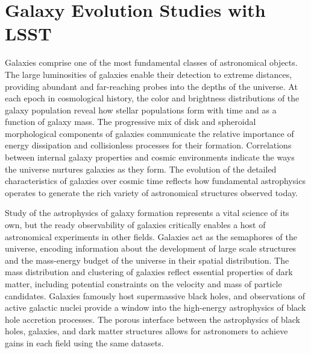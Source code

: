 
\makeatletter
\let\savedchap\@makechapterhead
\def\@makechapterhead{\vspace*{-3cm}\savedchap}
\chapter[Galaxy Evolution Studies with LSST]{Galaxy Evolution Studies with LSST}
\label{ch:science_background}
\let\@makechapterhead\savedchap
\makeatletter

{\justify


Galaxies comprise one of the most fundamental classes of astronomical objects. 
The large luminosities of galaxies enable their 
detection to extreme distances, providing abundant
and far-reaching probes into the depths of the universe.
At each epoch in cosmological history, the color
and brightness distributions of the galaxy population
reveal how stellar populations form with time and
as a function of galaxy mass. The progressive mix of
disk and spheroidal morphological components of 
galaxies communicate the relative importance of
energy dissipation and collisionless processes
for their formation.
Correlations between internal galaxy properties and
cosmic environments indicate
the ways the universe nurtures galaxies as they form.
The evolution of the
detailed characteristics of galaxies over cosmic time
reflects how fundamental astrophysics
operates to generate the rich variety of 
astronomical structures observed today.

Study of the astrophysics of galaxy formation represents
a vital science of its own, but the ready
observability of galaxies critically enables a host of
astronomical experiments in other fields. 
Galaxies act as the semaphores of the
universe, encoding information about
the development of large scale
structures and the mass-energy budget of the
universe in their spatial distribution. The mass distribution
and clustering of galaxies reflect essential
properties of dark matter, including potential
constraints on the velocity and mass of particle candidates.
Galaxies famously host supermassive black holes, 
and observations of active galactic nuclei provide
a window into the high-energy astrophysics of black hole
accretion processes. The porous interface between the
astrophysics of black holes, galaxies, and 
dark matter structures allows for astronomers to 
achieve gains in each field using the same datasets.

}
